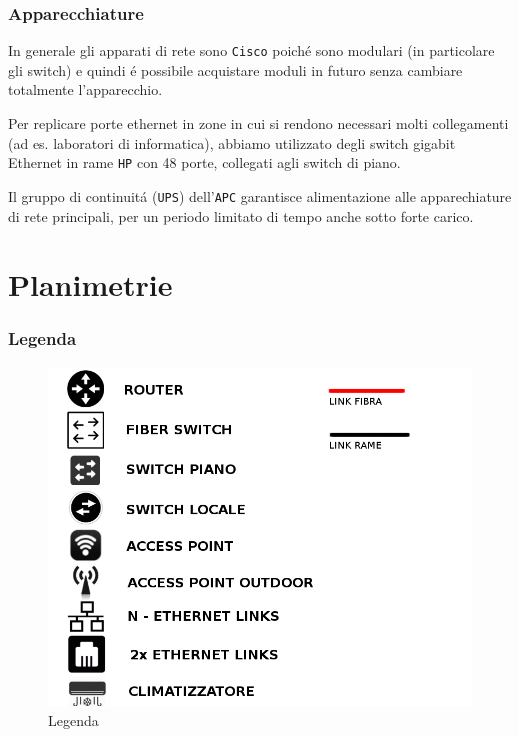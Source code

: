 \documentclass[11pt, a4paper, oneside]{article}
\begin{document}
		\section{Apparecchiature}
			\par
			In generale gli apparati di rete sono \texttt{Cisco} poich\'e sono modulari (in particolare gli switch) e quindi \'e possibile acquistare moduli in futuro senza cambiare totalmente l'apparecchio.
			\par
			Per replicare porte ethernet in zone in cui si rendono necessari molti collegamenti (ad es. laboratori di informatica), abbiamo utilizzato degli switch gigabit Ethernet in rame \texttt{HP} con 48 porte, collegati agli switch di piano.
			\par
			Il gruppo di continuit\'a (\texttt{UPS}) dell'\texttt{APC} garantisce alimentazione alle apparechiature di rete principali, per un periodo limitato di tempo anche sotto forte carico.
				
			\newpage
	\part{Planimetrie}
		\section{Legenda}
			\begin{figure}[H]
				\caption{Legenda}
				\includegraphics[scale=0.5]{legenda.png}
			\end{figure}
			\newpage
\end{document}
